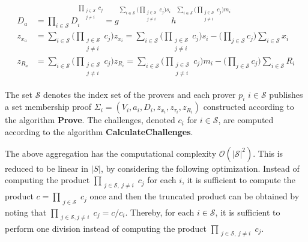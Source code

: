\begin{equation}
\begin{aligned}
\label{eq:aggDn}
D_a &=\prod_{i\in\mathcal{S}}  D_i ^{\prod_{\substack{j\in\mathcal{S}\\ j\neq i}} c_j }  =  g ^ {\sum_{i\in\mathcal{S}} \Big(\prod_{\substack{j\in\mathcal{S}\\ j\neq i}}   c_j \Big)s_i} h^ {\sum_{i\in\mathcal{S}} \Big( \prod_{\substack{j\in\mathcal{S} \\ j\neq i}}   c_j \Big) m_i}
\\
z_{x_a} &= \sum_{i\in\mathcal{S}} \Big( \prod_{\substack{j\in\mathcal{S}\\ j\neq i}} c_j \Big) z_{x_i} = \sum_{i\in\mathcal{S}} \Big( \prod_{\substack{j\in\mathcal{S}\\ j\neq i}} c_j \Big)s_i - \big( \prod_{j\in\mathcal{S}} c_j \big) \sum_{i\in\mathcal{S}} x_i
\\
z_{R_a} &=  \sum_{i\in\mathcal{S}}  \Big( \prod_{\substack{j\in\mathcal{S}\\ j\neq i}} c_j \Big) z_{R_i} = \sum_{i\in\mathcal{S}} \Big( \prod_{\substack{j\in\mathcal{S}\\ j\neq i}} c_j \Big)m_i - \big( \prod_{j\in\mathcal{S}} c_j \big) \sum_{i\in\mathcal{S}} R_i 
\end{aligned}
\end{equation}

The set $\mathcal{S}$ denotes the index set of the provers and each prover $p_i$ $i\in\mathcal{S}$ publishes a set membership proof $\Sigma_i = (V_i,a_i,D_i,z_{x_i},z_{\tau_i},z_{R_i})$ constructed according to the algorithm \textbf{Prove}. %
The challenges, denoted $c_i$ for $i\in\mathcal{S}$, are computed according to the algorithm \textbf{CalculateChallenges}.

The above aggregation has the computational complexity $\mathcal{O}(|\mathcal{S}|^2)$. This is reduced to be linear in $|S|$, by considering the following optimization. Instead of computing the product $\prod_{\substack{j\in\mathcal{S},\: j\neq i}} c_j $ for each $i$, it is sufficient to compute the product $c=\prod_{\substack{j\in\mathcal{S}}} c_j $  once and then the truncated product can be obtained by noting that $ \prod_{\substack{j\in\mathcal{S},j\neq i}} c_j = c/c_i $. Thereby, for each $i\in\mathcal{S}$, it is sufficient to perform one division instead of computing the product $\prod_{\substack{j\in\mathcal{S},\:j\neq i}} c_j $.

